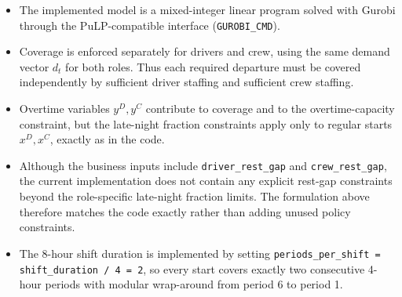 \begin{itemize}
    \item The implemented model is a mixed-integer linear program solved with Gurobi through the PuLP-compatible interface (\texttt{GUROBI\_CMD}).
    \item Coverage is enforced separately for drivers and crew, using the same demand vector $d_t$ for both roles. Thus each required departure must be covered independently by sufficient driver staffing and sufficient crew staffing.
    \item Overtime variables $y^D,y^C$ contribute to coverage and to the overtime-capacity constraint, but the late-night fraction constraints apply only to regular starts $x^D,x^C$, exactly as in the code.
    \item Although the business inputs include \texttt{driver\_rest\_gap} and \texttt{crew\_rest\_gap}, the current implementation does not contain any explicit rest-gap constraints beyond the role-specific late-night fraction limits. The formulation above therefore matches the code exactly rather than adding unused policy constraints.
    \item The 8-hour shift duration is implemented by setting \texttt{periods\_per\_shift = shift\_duration / 4 = 2}, so every start covers exactly two consecutive 4-hour periods with modular wrap-around from period 6 to period 1.
\end{itemize}
